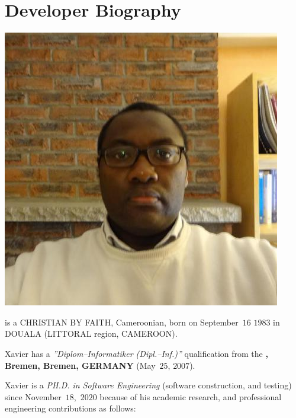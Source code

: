 \section{Developer Biography}\label{chap:biography}
\vspace{-0.9em}

\begin{center}
\includegraphics[scale=0.32]{../../francais/images/XavierNOUNDOU-2}
\end{center}

\textbf{\myfullacademicname} is a CHRISTIAN BY FAITH,
Cameroonian, born on September~$16$ $1983$ in
DOUALA (LITTORAL region, CAMEROON).

Xavier has a \textit{''Diplom--Informatiker (Dipl.--Inf.)''}
qualification from the \textbf{\unibremen, Bremen, Bremen, GERMANY} (May~$25$, $2007$).

Xavier is a \textit{PH.D. in Software Engineering}
(software construction, and testing) since November~$18$,~$2020$
because of his academic research, and professional engineering
contributions as follows:


